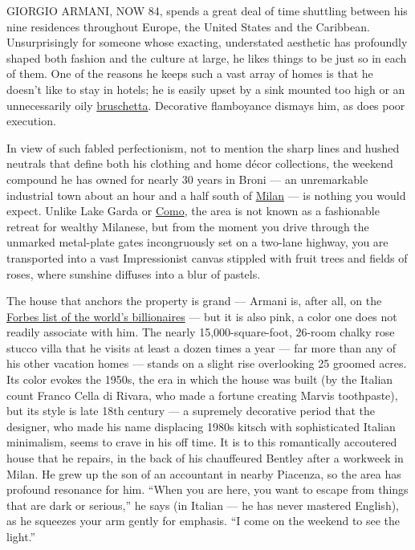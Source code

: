 GIORGIO ARMANI, NOW 84, spends a great deal of time shuttling between
his nine residences throughout Europe, the United States and the
Caribbean. Unsurprisingly for someone whose exacting, understated
aesthetic has profoundly shaped both fashion and the culture at large,
he likes things to be just so in each of them. One of the reasons he
keeps such a vast array of homes is that he doesn't like to stay in
hotels; he is easily upset by a sink mounted too high or an
unnecessarily oily
\href{https://cooking.nytimes.com/recipes/3846-sourdough-bruschetta}{bruschetta}.
Decorative flamboyance dismays him, as does poor execution.

In view of such fabled perfectionism, not to mention the sharp lines and
hushed neutrals that define both his clothing and home décor
collections, the weekend compound he has owned for nearly 30 years in
Broni --- an unremarkable industrial town about an hour and a half south
of
\href{https://www.nytimes.com/2015/01/11/travel/what-to-do-in-36-hours-in-milan.html}{Milan}
--- is nothing you would expect. Unlike Lake Garda or
\href{https://www.nytimes.com/2017/12/28/travel/lake-como-italy-younger-travelers.html}{Como},
the area is not known as a fashionable retreat for wealthy Milanese, but
from the moment you drive through the unmarked metal-plate gates
incongruously set on a two-lane highway, you are transported into a vast
Impressionist canvas stippled with fruit trees and fields of roses,
where sunshine diffuses into a blur of pastels.

The house that anchors the property is grand --- Armani is, after all,
on the
\href{https://www.forbes.com/profile/giorgio-armani/\#35f49c492c5b}{Forbes
list of the world's billionaires} --- but it is also pink, a color one
does not readily associate with him. The nearly 15,000-square-foot,
26-room chalky rose stucco villa that he visits at least a dozen times a
year --- far more than any of his other vacation homes --- stands on a
slight rise overlooking 25 groomed acres. Its color evokes the 1950s,
the era in which the house was built (by the Italian count Franco Cella
di Rivara, who made a fortune creating Marvis toothpaste), but its style
is late 18th century --- a supremely decorative period that the
designer, who made his name displacing 1980s kitsch with sophisticated
Italian minimalism, seems to crave in his off time. It is to this
romantically accoutered house that he repairs, in the back of his
chauffeured Bentley after a workweek in Milan. He grew up the son of an
accountant in nearby Piacenza, so the area has profound resonance for
him. ``When you are here, you want to escape from things that are dark
or serious,'' he says (in Italian --- he has never mastered English), as
he squeezes your arm gently for emphasis. ``I come on the weekend to see
the light.''

